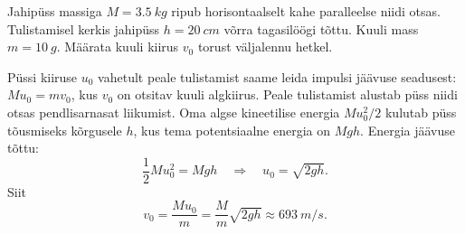 
Jahipüss massiga $M = \SI{3,5}{kg}$ ripub horisontaalselt kahe paralleelse niidi otsas. Tulistamisel kerkis jahipüss $h = \SI{20}{cm}$ võrra tagasilöögi tõttu. Kuuli mass $m = \SI{10}{g}$. Määrata kuuli kiirus $v_0$ torust väljalennu hetkel.

\hint

\solu
Püssi kiiruse $u_{0}$ vahetult peale tulistamist saame leida impulsi jäävuse seadusest:
$M u_{0}=m v_{0}$, kus $v_{0}$ on otsitav kuuli algkiirus. Peale tulistamist alustab püss niidi otsas pendlisarnasat liikumist. Oma algse kineetilise energia $M u_{0}^{2} / 2$ kulutab püss tõusmiseks kõrgusele $h$, kus tema potentsiaalne energia on $M g h$. Energia jäävuse tõttu:
$$
\frac{1}{2} M u_{0}^{2}=M g h \quad \Rightarrow \quad u_{0}=\sqrt{2 g h}.
$$
Siit
$$
v_{0}=\frac{M u_{0}}{m}=\frac{M}{m} \sqrt{2 g h} \approx \SI{693}{m/s}.
$$
\probend